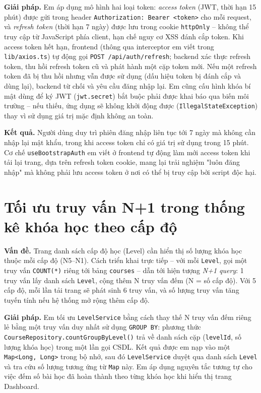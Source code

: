 \documentclass[../DoAn.tex]{subfiles}
\begin{document}
\textbf{Giải pháp.} Em áp dụng mô hình hai loại token: \textit{access token} (JWT, thời hạn 15 phút) được gửi trong header \texttt{Authorization: Bearer <token>} cho mỗi request, và \textit{refresh token} (thời hạn 7 ngày) được lưu trong cookie \texttt{httpOnly} -- không thể truy cập từ JavaScript phía client, hạn chế nguy cơ XSS đánh cắp token. Khi access token hết hạn, frontend (thông qua interceptor em viết trong \texttt{lib/axios.ts}) tự động gọi \texttt{POST /api/auth/refresh}; backend xác thực refresh token, thu hồi refresh token cũ và phát hành một cặp token mới. Nếu một refresh token đã bị thu hồi nhưng vẫn được sử dụng (dấu hiệu token bị đánh cắp và dùng lại), backend từ chối và yêu cầu đăng nhập lại. Em cũng cấu hình khóa bí mật dùng để ký JWT (\texttt{jwt.secret}) bắt buộc phải được khai báo qua biến môi trường -- nếu thiếu, ứng dụng sẽ không khởi động được (\texttt{IllegalStateException}) thay vì sử dụng giá trị mặc định không an toàn.

\textbf{Kết quả.} Người dùng duy trì phiên đăng nhập liên tục tới 7 ngày mà không cần nhập lại mật khẩu, trong khi access token chỉ có giá trị sử dụng trong 15 phút. Cơ chế \texttt{useBootstrapAuth} em viết ở frontend tự động làm mới access token khi tải lại trang, dựa trên refresh token cookie, mang lại trải nghiệm "luôn đăng nhập" mà không phải lưu access token ở nơi có thể bị truy cập bởi script độc hại.

\section{Tối ưu truy vấn N+1 trong thống kê khóa học theo cấp độ}
\label{section:5.4}

\textbf{Vấn đề.} Trang danh sách cấp độ học (Level) cần hiển thị số lượng khóa học thuộc mỗi cấp độ (N5--N1). Cách triển khai trực tiếp -- với mỗi \texttt{Level}, gọi một truy vấn \texttt{COUNT(*)} riêng tới bảng \texttt{courses} -- dẫn tới hiện tượng \textit{N+1 query}: 1 truy vấn lấy danh sách \texttt{Level}, cộng thêm N truy vấn đếm (N = số cấp độ). Với 5 cấp độ, mỗi lần tải trang sẽ phát sinh 6 truy vấn, và số lượng truy vấn tăng tuyến tính nếu hệ thống mở rộng thêm cấp độ.

\textbf{Giải pháp.} Em tối ưu \texttt{LevelService} bằng cách thay thế N truy vấn đếm riêng lẻ bằng một truy vấn duy nhất sử dụng \texttt{GROUP BY}: phương thức \texttt{CourseRepository.countGroupByLevel()} trả về danh sách cặp (\texttt{levelId}, số lượng khóa học) trong một lần gọi CSDL. Kết quả được em nạp vào một \texttt{Map<Long, Long>} trong bộ nhớ, sau đó \texttt{LevelService} duyệt qua danh sách \texttt{Level} và tra cứu số lượng tương ứng từ \texttt{Map} này. Em áp dụng nguyên tắc tương tự cho việc đếm số bài học đã hoàn thành theo từng khóa học khi hiển thị trang Dashboard.
\end{document}
